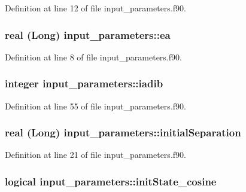 Definition at line 12 of file input\_\-parameters.f90.

\hypertarget{namespaceinput__parameters_ac937498371c0568d2d4ed1e1ef034e1d}{
\subsubsection[{ea}]{\setlength{\rightskip}{0pt plus 5cm}real (Long) {\bf input\_\-parameters::ea}}}
\label{namespaceinput__parameters_ac937498371c0568d2d4ed1e1ef034e1d}


Definition at line 8 of file input\_\-parameters.f90.

\hypertarget{namespaceinput__parameters_a2b1e4d8baaa62168d989002cf747b30b}{
\subsubsection[{iadib}]{\setlength{\rightskip}{0pt plus 5cm}integer {\bf input\_\-parameters::iadib}}}
\label{namespaceinput__parameters_a2b1e4d8baaa62168d989002cf747b30b}


Definition at line 55 of file input\_\-parameters.f90.

\hypertarget{namespaceinput__parameters_a1d8bbaa8b473b798cb43170831cc57ac}{
\subsubsection[{initialSeparation}]{\setlength{\rightskip}{0pt plus 5cm}real (Long) {\bf input\_\-parameters::initialSeparation}}}
\label{namespaceinput__parameters_a1d8bbaa8b473b798cb43170831cc57ac}


Definition at line 21 of file input\_\-parameters.f90.

\hypertarget{namespaceinput__parameters_a794b8486b7ecd6258448887bce533681}{
\subsubsection[{initState\_\-cosine}]{\setlength{\rightskip}{0pt plus 5cm}logical {\bf input\_\-parameters::initState\_\-cosine}}}
\label{namespaceinput__parameters_a794b8486b7ecd6258448887bce533681}


